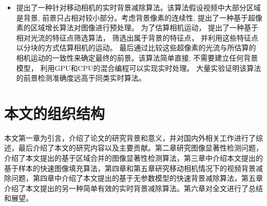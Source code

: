 \begin{itemize}
    \item 提出了一种针对移动相机的实时背景减除算法。该算法假设视频中大部分区域是背景, 前景只占相对较小部分。考虑背景像素的连续性, 提出了一种基于超像素的区域增长算法对图像进行预处理。 为了估算相机运动， 提出了一种基于相对光流的特征点筛选算法， 筛选出属于背景的特征点， 并利用这些特征点以分块的方式估算相机的运动。 最后通过比较这些超像素的光流与所估算的相机运动的一致性来确定最终的前景。该算法简单直接, 不需要建立任何背景模型， 利用GPU和CPU的混合编程可以实现实时处理。 大量实验证明该算法的前景检测准确度远高于同类实时算法。
  \end{itemize}
\section{本文的组织结构}
本文第一章为引言，介绍了论文的研究背景和意义，并对国内外相关工作进行了综述，最后介绍了本文的研究内容以及主要贡献。第二章研究图像显著性检测问题，介绍了本文提出的基于区域合并的图像显著性检测算法，第三章中介绍本文提出的基于样本的快速图像填充算法，第四章和第五章研究移动相机情况下的视频背景减除问题，第四章中介绍了本文提出的基于无参数模型的快速背景减除算法，第五章介绍了本文提出的另一种简单有效的实时背景减除算法。第六章对全文进行了总结和展望。
\label{sec:hierarchy} 